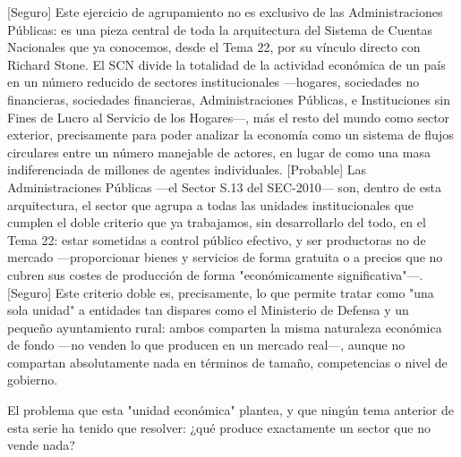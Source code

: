 \documentclass[10pt,a4paper]{article}
\begin{document}
[Seguro] Este ejercicio de agrupamiento no es exclusivo de las Administraciones Públicas: es una pieza central de toda la arquitectura del Sistema de Cuentas Nacionales que ya conocemos, desde el Tema 22, por su vínculo directo con Richard Stone. El SCN divide la totalidad de la actividad económica de un país en un número reducido de sectores institucionales —hogares, sociedades no financieras, sociedades financieras, Administraciones Públicas, e Instituciones sin Fines de Lucro al Servicio de los Hogares—, más el resto del mundo como sector exterior, precisamente para poder analizar la economía como un sistema de flujos circulares entre un número manejable de actores, en lugar de como una masa indiferenciada de millones de agentes individuales. [Probable] Las Administraciones Públicas —el Sector S.13 del SEC-2010— son, dentro de esta arquitectura, el sector que agrupa a todas las unidades institucionales que cumplen el doble criterio que ya trabajamos, sin desarrollarlo del todo, en el Tema 22: estar sometidas a control público efectivo, y ser productoras no de mercado —proporcionar bienes y servicios de forma gratuita o a precios que no cubren sus costes de producción de forma "económicamente significativa"—. [Seguro] Este criterio doble es, precisamente, lo que permite tratar como "una sola unidad" a entidades tan dispares como el Ministerio de Defensa y un pequeño ayuntamiento rural: ambos comparten la misma naturaleza económica de fondo —no venden lo que producen en un mercado real—, aunque no compartan absolutamente nada en términos de tamaño, competencias o nivel de gobierno.

El problema que esta "unidad económica" plantea, y que ningún tema anterior de esta serie ha tenido que resolver: ¿qué produce exactamente un sector que no vende nada?
\end{document}
